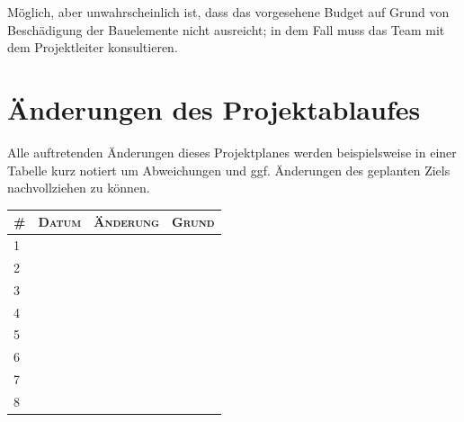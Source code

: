 \documentclass[lang=ngerman,inputenc=utf8,fontsize=10pt]{ldvarticle}
\begin{document}
Möglich, aber unwahrscheinlich ist, dass das vorgesehene Budget auf Grund von Beschädigung der Bauelemente nicht ausreicht; in dem Fall muss das Team mit dem Projektleiter konsultieren.


\section{Änderungen des Projektablaufes}
Alle auftretenden Änderungen dieses Projektplanes werden beispielsweise in einer Tabelle kurz notiert um Abweichungen und ggf. Änderungen des geplanten Ziels nachvollziehen zu können.



\begin{tabular}[htbp]{|p{}||p{}|p{}|p{}|}
	\hline
	\textsc{\#} & \textsc{Datum} & \textsc{Änderung} & \textsc{Grund} \\
	\hline
	\hline
	1 & & & \\[1em]
	\hline
	2 & & & \\[1em]
	\hline
	3 & & & \\[1em]
	\hline
	4 & & & \\[1em]
	\hline
	5 & & & \\[1em]
	\hline
	6 & & & \\[1em]
	\hline
	7 & & & \\[1em]
	\hline
	8 & & & \\[1em]
	\hline
\end{tabular}
\end{document}
